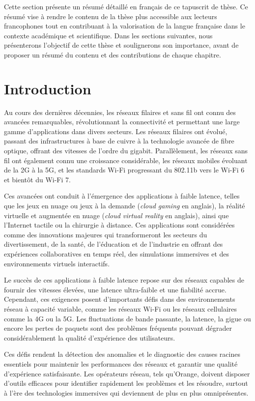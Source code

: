 Cette section présente un résumé détaillé en français de ce tapuscrit de thèse. Ce résumé vise à rendre le contenu de la thèse plus accessible aux lecteurs francophones tout en contribuant à la valorisation de la langue française dans le contexte académique et scientifique. Dans les sections suivantes, nous présenterons l'objectif de cette thèse et soulignerons son importance, avant de proposer un résumé du contenu et des contributions de chaque chapitre.

\section*{Introduction}

Au cours des dernières décennies, les réseaux filaires et sans fil ont connu des avancées remarquables, révolutionnant la connectivité et permettant une large gamme d'applications dans divers secteurs. Les réseaux filaires ont évolué, passant des infrastructures à base de cuivre à la technologie avancée de fibre optique, offrant des vitesses de l'ordre du gigabit. Parallèlement, les réseaux sans fil ont également connu une croissance considérable, les réseaux mobiles évoluant de la 2G à la 5G, et les standards Wi-Fi progressant du 802.11b vers le Wi-Fi 6 et bientôt du Wi-Fi 7.

Ces avancées ont conduit à l'émergence des applications à faible latence, telles que les jeux en nuage ou jeux à la demande  (\textit{cloud gaming} en anglais), la réalité virtuelle et augmentée en nuage (\textit{cloud virtual reality} en anglais), ainsi que l'Internet tactile ou la chirurgie à distance. Ces applications sont considérées comme des innovations majeures qui transformeront les secteurs du divertissement, de la santé, de l’éducation et de l’industrie en offrant des expériences collaboratives en temps réel, des simulations immersives et des environnements virtuels interactifs.

Le succès de ces applications à faible latence repose sur des réseaux capables de fournir des vitesses élevées, une latence ultra-faible et une fiabilité accrue. Cependant, ces exigences posent d'importants défis dans des environnements réseau à capacité variable, comme les réseaux Wi-Fi ou les réseaux cellulaires comme la 4G ou la 5G. Les fluctuations de bande passante, la latence, la gigue ou encore les pertes de paquets sont des problèmes fréquents pouvant dégrader considérablement la qualité d’expérience des utilisateurs.

Ces défis rendent la détection des anomalies et le diagnostic des causes racines essentiels pour maintenir les performances des réseaux et garantir une qualité d'expérience satisfaisante. Les opérateurs réseau, tels qu’Orange, doivent disposer d’outils efficaces pour identifier rapidement les problèmes et les résoudre, surtout à l'ère des technologies immersives qui deviennent de plus en plus omniprésentes.


